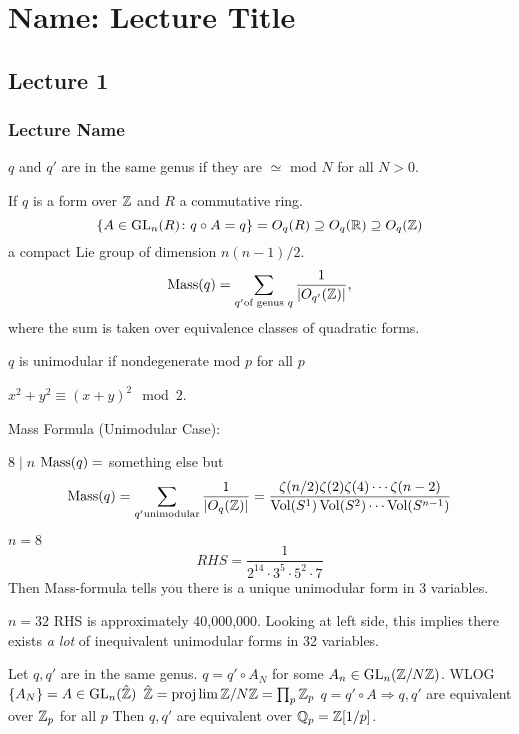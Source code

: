 \newpage
\section{Name: Lecture Title}
\subsection{Lecture 1}
\subsubsection{Lecture Name}



\begin{dfn}
$q$ and $q'$ are in the same genus if they are $\simeq$ mod $N$ for all $N>0$.
\end{dfn}

If $q$ is a form over $\mathbb{Z}$ and $R$ a commutative ring.
	\[
	\{ A \in \operatorname{GL}_n(R) \colon q \circ A=q \}= O_q(R) \supseteq O_q(\mathbb{R}) \supseteq O_q(\mathbb{Z})
	\]
a compact Lie group of dimension $n(n-1)/2$. 
	\[
	\operatorname{Mass}(q)= \sum_{q' \text{of genus }q} \dfrac{1}{|O_{q'}(\mathbb{Z})|},
	\]
where the sum is taken over equivalence classes of quadratic forms.


\begin{dfn}[Unimodular]
$q$ is unimodular if nondegenerate mod $p$ for all $p$
\end{dfn}

$x^2+y^2 \equiv (x+y)^2 \mod 2$.

Mass Formula (Unimodular Case):

$8 \mid n$
$\operatorname{Mass}(q)=$ something else but
	\[
	\operatorname{Mass}(q)= \sum_{q' \text{unimodular}} \dfrac{1}{|O_q(\mathbb{Z})|}= \dfrac{\zeta(n/2)\zeta(2)\zeta(4)\cdots\zeta(n-2)}{\operatorname{Vol}(S^1)\operatorname{Vol}(S^2)\cdots\operatorname{Vol}(S^{n-1})}
	\]


\begin{ex}
$n=8$ 
	\[
	RHS= \dfrac{1}{2^{14}\cdot3^5\cdot5^2\cdot7}
	\]
Then Mass-formula tells you there is a unique unimodular form in 3 variables.
\end{ex}


\begin{ex}
$n=32$
RHS is approximately 40,000,000. Looking at left side, this implies there exists \emph{a lot} of inequivalent unimodular forms in 32 variables. 
\end{ex}


Let $q,q'$ are in the same genus. 
$q= q' \circ A_N$ for some $A_n \in \operatorname{GL}_n(\mathbb{Z}/N\mathbb{Z})$.
WLOG $\{A_N\}= A \in \operatorname{GL}_n(\hat{\mathbb{Z}})$
$\hat{\mathbb{Z}}= \projlim \mathbb{Z}/N\mathbb{Z}= \prod_p \mathbb{Z}_p$
$q= q' \circ A \Rightarrow q,q'$ are equivalent over $\mathbb{Z}_p$ for all $p$
Then $q,q'$ are equivalent over $\mathbb{Q}_p= \mathbb{Z}[1/p]$.


